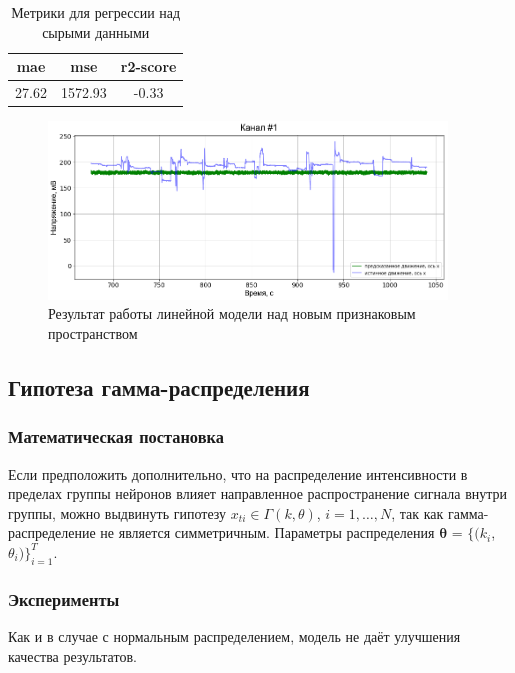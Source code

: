 \documentclass{mipt-thesis-bs}
\begin{document}
\begin{table}[h]
  
  \centering
    \begin{tabular}{  | c | c | c | }
	\hline
	mae & mse & r2-score \\ \hline
	27.62 & 1572.93 & -0.33 \\
	\hline
	\end{tabular}
\caption{Метрики для регрессии над сырыми данными}
\label{table:param_reg}
\end{table}

\begin{figure}[h]
\begin{center}
	\includegraphics[width=300pt,height=\textheight,keepaspectratio]{imgs/motion_by_params.png}
	
	\caption{Результат работы линейной модели над новым признаковым пространством}	
	\label{fig:gauss}
\end{center}
\end{figure}


 
\subsection{Гипотеза гамма-распределения}

\subsubsection{Математическая постановка} 
Если предположить дополнительно, что на распределение интенсивности в пределах группы нейронов влияет направленное распространение сигнала внутри группы, можно выдвинуть гипотезу $x_{ti}
\in \Gamma(k, \theta)$, $i=1,\dots,N$, так как гамма-распределение не является симметричным. Параметры распределения $\mathbf{\theta}$ = $\{(k_i$, $\theta_i)\}_{i=1}^T$. 
\subsubsection{Эксперименты}
Как и в случае с нормальным распределением, модель не даёт улучшения качества результатов.
\end{document}
